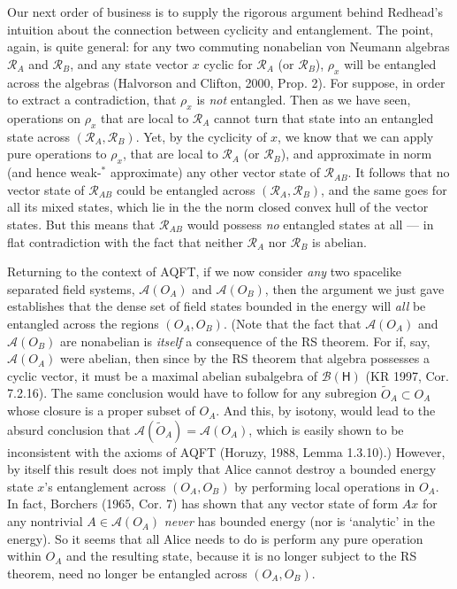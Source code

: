 \documentclass[12pt]{article}
\newcommand{\alg}[1]{\mbox{$\mathcal{#1}$}}
\newcommand{\hil}[1]{\mbox{$\mathsf{#1}$}}
\begin{document}
Our next order of business is to supply the rigorous argument behind Redhead's intuition about 
the connection between cyclicity and entanglement.  The point, again, 
is quite general: for any two commuting nonabelian von Neumann algebras $\alg{R}_{A}$ and 
$\alg{R}_{B}$, and any state vector $x$ cyclic for $\alg{R}_{A}$ 
(or $\alg{R}_{B}$), $\rho_{x}$ will be entangled across the algebras 
(Halvorson and Clifton, 2000, Prop. 2). For suppose, in order to 
extract a contradiction, that $\rho_{x}$ is \emph{not} 
entangled.  Then as we have seen, operations on $\rho_{x}$ that are local to $\alg{R}_{A}$ cannot 
turn that state into an entangled state across 
$(\alg{R}_{A},\alg{R}_{B})$.  Yet, by the cyclicity of $x$, we know that we can apply pure operations 
to $\rho_{x}$, that are local to 
$\alg{R}_{A}$ 
(or $\alg{R}_{B}$),  and approximate in norm (and hence weak-$^{*}$ 
approximate) any other vector state of 
$\alg{R}_{AB}$.  It follows that no vector state of $\alg{R}_{AB}$ 
could be entangled across $(\alg{R}_{A},\alg{R}_{B})$, and the same goes for 
all its mixed states, which lie in the the norm closed convex hull of the 
vector states.  
But this means that 
$\alg{R}_{AB}$ would possess \emph{no} entangled states at all --- in 
flat 
contradiction with the fact that neither $\alg{R}_{A}$ nor 
$\alg{R}_{B}$ is abelian.  

Returning to the context of AQFT, if we now consider \emph{any} two spacelike 
separated field systems, $\alg{A}(O_{A})$ and $\alg{A}(O_{B})$, then 
the argument we just gave establishes that the dense set of field 
states bounded in the energy will \emph{all} be entangled across the regions 
$(O_{A},O_{B})$.  (Note that the fact that $\alg{A}(O_{A})$ and 
$\alg{A}(O_{B})$
are nonabelian is \emph{itself} a consequence of the RS theorem.  For 
if, say, 
$\alg{A}(O_{A})$ were abelian, then since by the RS theorem that algebra  possesses a cyclic 
vector, it must be a maximal abelian subalgebra of $\alg{B}(\hil{H})$ (KR 1997, 
Cor. 7.2.16).  The same conclusion would have to follow for any 
subregion $\tilde{O}_{A}\subset O_{A}$ whose closure is a proper 
subset of $O_{A}$.  
And this, by isotony, 
would lead to the absurd 
conclusion that $\alg{A}(\tilde{O}_{A})=\alg{A}(O_{A})$, which is 
easily shown to be inconsistent with the axioms of AQFT (Horuzy, 1988, 
Lemma 1.3.10).)  
However, by itself this result does not 
imply that Alice cannot destroy a bounded energy state $x$'s entanglement 
across $(O_{A}, O_{B})$ by performing local operations in $O_{A}$.  
In fact, Borchers (1965, Cor. 7) has shown
that any vector state of form $Ax$ for any nontrivial $A\in \alg{A}(O_{A})$ \emph{never} 
has bounded energy (nor is `analytic' in the energy).  So it seems that all 
Alice needs to do is perform any pure operation within $O_{A}$ and the 
resulting state, because it is no longer subject to the RS theorem, 
need no longer be entangled across $(O_{A}, O_{B})$.  
\end{document}
